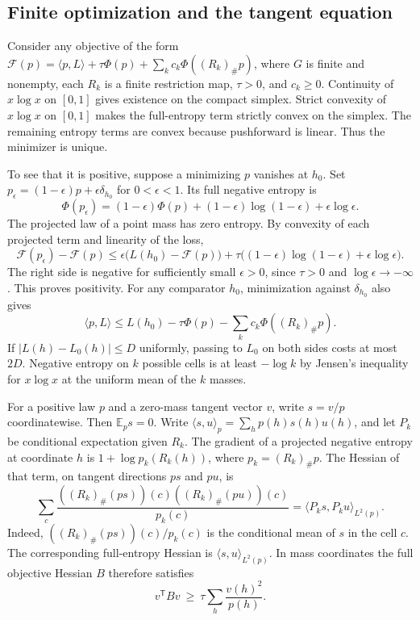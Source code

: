 \documentclass[11pt]{article}
\theoremstyle{definition}\newtheorem{definition}[theorem]{Definition}
\begin{document}
\subsection{Finite optimization and the tangent equation}

Consider any objective of the form
$\mathcal F(p)=\langle p,L\rangle+\tau\Phi(p)+\sum_k c_k\Phi((R_k)_\#p)$,
where $G$ is finite and nonempty, each $R_k$ is a finite restriction map,
$\tau>0$, and $c_k\ge0$. Continuity of $x\log x$ on $[0,1]$ gives existence on
the compact simplex. Strict convexity of $x\log x$ on $[0,1]$ makes the
full-entropy term strictly convex on the simplex. The remaining entropy terms
are convex because pushforward is linear. Thus the minimizer is unique.

To see that it is positive, suppose a minimizing $p$ vanishes at $h_0$. Set
$p_\epsilon=(1-\epsilon)p+\epsilon\delta_{h_0}$ for $0<\epsilon<1$. Its full
negative entropy is
\[
  \Phi(p_\epsilon)=(1-\epsilon)\Phi(p)
       +(1-\epsilon)\log(1-\epsilon)+\epsilon\log\epsilon.
\]
The projected law of a point mass has zero entropy. By convexity of each
projected term and linearity of the loss,
\[
  \mathcal F(p_\epsilon)-\mathcal F(p)
  \le \epsilon\bigl(L(h_0)-\mathcal F(p)\bigr)
       +\tau\bigl((1-\epsilon)\log(1-\epsilon)
                   +\epsilon\log\epsilon\bigr).
\]
The right side is negative for sufficiently small $\epsilon>0$, since
$\tau>0$ and $\log\epsilon\to-\infty$. This proves positivity. For any
comparator $h_0$, minimization against $\delta_{h_0}$ also gives
\[
  \langle p,L\rangle\le L(h_0)-\tau\Phi(p)-\sum_k c_k\Phi((R_k)_\#p).
\]
If $|L(h)-L_0(h)|\le D$ uniformly, passing to $L_0$ on both sides costs at
most $2D$. Negative entropy on $k$ possible cells is at least $-\log k$ by
Jensen's inequality for $x\log x$ at the uniform mean of the $k$ masses.

For a positive law $p$ and a zero-mass tangent vector $v$, write $s=v/p$
coordinatewise. Then $\mathbb E_p s=0$. Write $\langle s,u\rangle_p=\sum_h p(h)s(h)u(h)$,
and let $P_k$ be conditional expectation given $R_k$. The gradient of a
projected negative entropy at coordinate $h$ is $1+\log p_k(R_k(h))$,
where $p_k=(R_k)_\#p$. The
Hessian of that term, on tangent directions $ps$ and $pu$, is
\begin{equation}
  \sum_c \frac{((R_k)_\#(ps))(c)((R_k)_\#(pu))(c)}{p_k(c)}
    =\langle P_k s,P_k u\rangle_{L^2(p)}.
  \label{eq:deletion-hessian}
\end{equation}
Indeed, $((R_k)_\#(ps))(c)/p_k(c)$ is the conditional mean of $s$ in the
cell $c$. The corresponding full-entropy Hessian is
$\langle s,u\rangle_{L^2(p)}$. In mass coordinates the full objective Hessian
$B$ therefore satisfies
\begin{equation}
  v^{\mathsf T}Bv\ \ge\ \tau\sum_h\frac{v(h)^2}{p(h)}.
  \label{eq:deletion-hessian-positive}
\end{equation}
\end{document}
